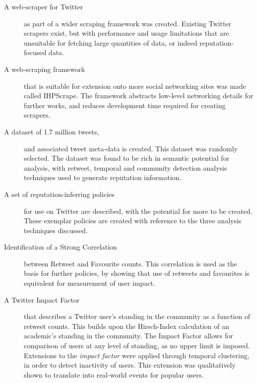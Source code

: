 \begin{description}

	\item [A web-scraper for Twitter] as part of a wider scraping framework was created. Existing Twitter scrapers exist, but with performance and usage limitations that are unsuitable for fetching large quantities of data, or indeed reputation-focused data.
	
	\item [A web-scraping framework] that is suitable for extension onto more social networking sites was made called IHPScrape. The framework abstracts low-level networking details for further works, and reduces development time required for creating scrapers.
	
	\item [A dataset of 1.7 million tweets,] and associated tweet meta-data is created. This dataset was randomly selected. The dataset was found to be rich in semantic potential for analysis, with retweet, temporal and community detection analysis techniques used to generate reputation information. 
	
	\item [A set of reputation-inferring policies] for use on Twitter are described, with the potential for more to be created. These exemplar policies are created with reference to the three analysis techniques discussed.
	
	
	\item[Identification of a Strong Correlation] between Retweet and Favourite counts. This correlation is used as the basis for further policies, by showing that use of retweets and favourites is equivalent for measurement of user impact.
	
	\item [A Twitter Impact Factor] that describes a Twitter user's standing in the community as a function of retweet counts. This builds upon the Hirsch-Index \cite{hirsch2005index} calculation of an academic's standing in the community. The Impact Factor allows for comparison of users at any level of standing, as no upper limit is imposed. Extensions to the \textit{impact factor} were applied through temporal clustering, in order to detect inactivity of users. This extension was qualitatively shown to translate into real-world events for popular users.	
	
	
	
\end{description}

